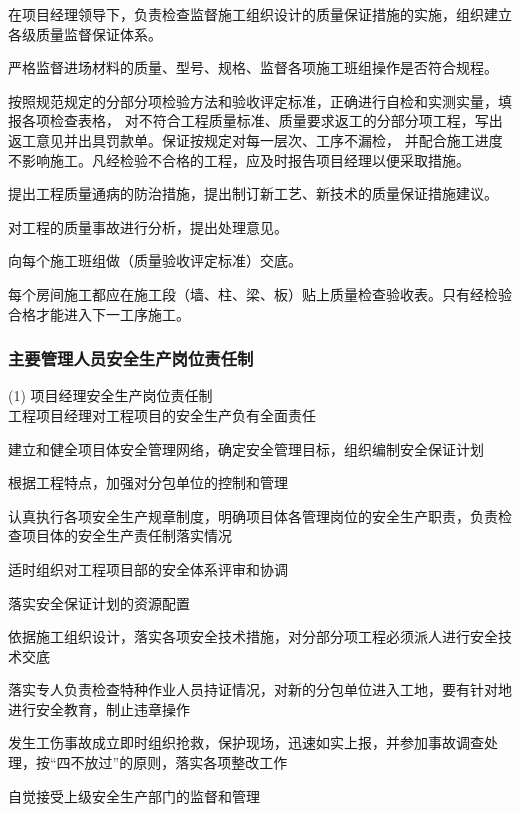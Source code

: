  在项目经理领导下，负责检查监督施工组织设计的质量保证措施的实施，组织建立各级质量监督保证体系。

 严格监督进场材料的质量、型号、规格、监督各项施工班组操作是否符合规程。

 按照规范规定的分部分项检验方法和验收评定标准，正确进行自检和实测实量，填报各项检查表格，
对不符合工程质量标准、质量要求返工的分部分项工程，写出返工意见并出具罚款单。保证按规定对每一层次、工序不漏检，
并配合施工进度不影响施工。凡经检验不合格的工程，应及时报告项目经理以便采取措施。

 提出工程质量通病的防治措施，提出制订新工艺、新技术的质量保证措施建议。

 对工程的质量事故进行分析，提出处理意见。

 向每个施工班组做（质量验收评定标准）交底。

 每个房间施工都应在施工段（墙、柱、梁、板）贴上质量检查验收表。只有经检验合格才能进入下一工序施工。 \\

\subsubsection{主要管理人员安全生产岗位责任制}

(1) 项目经理安全生产岗位责任制\\

 工程项目经理对工程项目的安全生产负有全面责任

 建立和健全项目体安全管理网络，确定安全管理目标，组织编制安全保证计划

 根据工程特点，加强对分包单位的控制和管理

 认真执行各项安全生产规章制度，明确项目体各管理岗位的安全生产职责，负责检查项目体的安全生产责任制落实情况

 适时组织对工程项目部的安全体系评审和协调

 落实安全保证计划的资源配置

 依据施工组织设计，落实各项安全技术措施，对分部分项工程必须派人进行安全技术交底

 落实专人负责检查特种作业人员持证情况，对新的分包单位进入工地，要有针对地进行安全教育，制止违章操作

 发生工伤事故成立即时组织抢救，保护现场，迅速如实上报，并参加事故调查处理，按“四不放过”的原则，落实各项整改工作

 自觉接受上级安全生产部门的监督和管理\\

